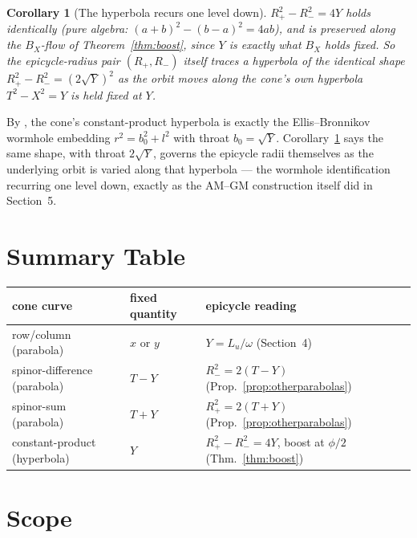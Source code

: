 \documentclass[12pt]{amsart}
\theoremstyle{plain}
\newtheorem{corollary}[theorem]{Corollary}
\theoremstyle{remark}
\begin{document}
\begin{corollary}[The hyperbola recurs one level down]\label{cor:recur}
$R_+^2-R_-^2=4Y$ holds identically (pure algebra: $(a+b)^2-(b-a)^2=4ab$), and is preserved along the $B_X$-flow of Theorem~\ref{thm:boost}, since $Y$ is exactly what $B_X$ holds fixed. So the epicycle-radius pair $(R_+,R_-)$ itself traces a hyperbola of the identical shape $R_+^2-R_-^2=(2\sqrt Y)^2$ as the orbit moves along the cone's own hyperbola $T^2-X^2=Y$ is held fixed at $Y$.
\end{corollary}

By \cite{Ebert2026Wormhole}, the cone's constant-product hyperbola is exactly the Ellis--Bronnikov wormhole embedding $r^2=b_0^2+l^2$ with throat $b_0=\sqrt Y$. Corollary~\ref{cor:recur} says the same shape, with throat $2\sqrt Y$, governs the epicycle radii themselves as the underlying orbit is varied along that hyperbola --- the wormhole identification recurring one level down, exactly as the AM--GM construction itself did in Section~5.

\section{Summary Table}

\begin{center}
\begin{tabular}{lll}
\hline
cone curve & fixed quantity & epicycle reading \\
\hline
row/column (parabola) & $x$ or $y$ & $Y=L_u/\omega$ (Section~4) \\
spinor-difference (parabola) & $T-Y$ & $R_-^2=2(T-Y)$ (Prop.~\ref{prop:otherparabolas}) \\
spinor-sum (parabola) & $T+Y$ & $R_+^2=2(T+Y)$ (Prop.~\ref{prop:otherparabolas}) \\
constant-product (hyperbola) & $Y$ & $R_+^2-R_-^2=4Y$, boost at $\phi/2$ (Thm.~\ref{thm:boost}) \\
\hline
\end{tabular}
\end{center}

\section{Scope}
\end{document}
